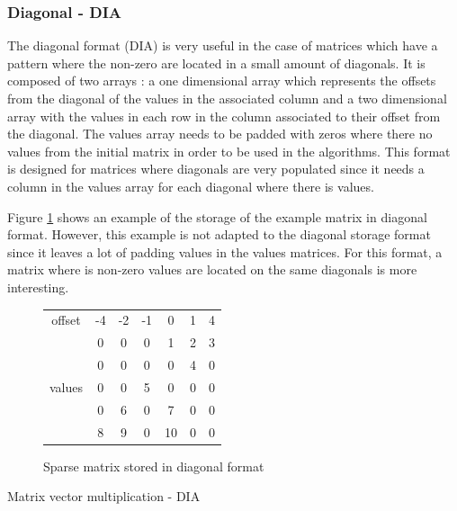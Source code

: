 \subsubsection{Diagonal - DIA}
The diagonal format (DIA) is very useful in the case of matrices which have a pattern where the non-zero are located in a small amount of diagonals.
It is composed of two arrays : a one dimensional array which represents the offsets from the diagonal of the values in the associated column and a two dimensional array with the values in each row in the column associated to their offset from the diagonal.
The values array needs to be padded with zeros where there no values from the initial matrix in order to be used in the algorithms.
This format is designed for matrices where diagonals are very populated since it needs a column in the values array for each diagonal where there is values.

Figure \ref{fig:methods:dia_ex} shows an example of the storage of the example matrix in diagonal format.
However, this example is not adapted to the diagonal storage format since it leaves a lot of padding values in the values matrices.
For this format, a matrix where is non-zero values are located on the same diagonals is more interesting.

\begin{figure}
\centering
\begin{tabular}{c|cccccc|}
	\cline{2-7}
	        offset          & -4 & -2 & -1 & 0  & 1 & 4 \\ \cline{2-7}
	\multirow{5}{*}{values} & 0  & 0  & 0  & 1  & 2 & 3 \\
	                        & 0  & 0  & 0  & 0  & 4 & 0 \\
	                        & 0  & 0  & 5  & 0  & 0 & 0 \\
	                        & 0  & 6  & 0  & 7  & 0 & 0 \\
	                        & 8  & 9  & 0  & 10 & 0 & 0 \\ \cline{2-7}
\end{tabular}
\caption{Sparse matrix stored in diagonal format \label{fig:methods:dia_ex}}
\end{figure}

\begin{algorithm}[h]
	\DontPrintSemicolon
	\caption{Matrix vector multiplication - DIA\label{fig:methods:dia_algo}}
\end{algorithm}


